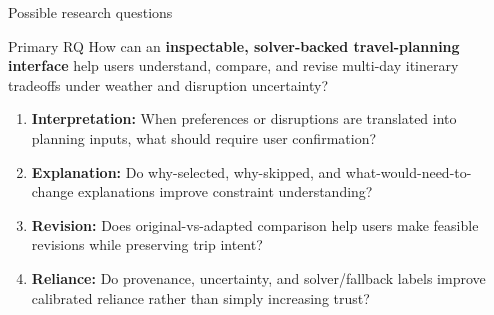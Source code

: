 \documentclass[aspectratio=169,10pt]{beamer}
\newcommand{\key}[1]{\textcolor{MutedBlue}{\textbf{#1}}}
\begin{document}
\begin{frame}{Possible research questions}
\begin{block}{Primary RQ}
\large How can an \key{inspectable, solver-backed travel-planning interface} help users understand, compare, and revise multi-day itinerary tradeoffs under weather and disruption uncertainty?
\end{block}

\vspace{0.25em}
\begin{enumerate}
\item \textbf{Interpretation:} When preferences or disruptions are translated into planning inputs, what should require user confirmation?
\item \textbf{Explanation:} Do why-selected, why-skipped, and what-would-need-to-change explanations improve constraint understanding?
\item \textbf{Revision:} Does original-vs-adapted comparison help users make feasible revisions while preserving trip intent?
\item \textbf{Reliance:} Do provenance, uncertainty, and solver/fallback labels improve calibrated reliance rather than simply increasing trust?
\end{enumerate}
\end{frame}
\end{document}
